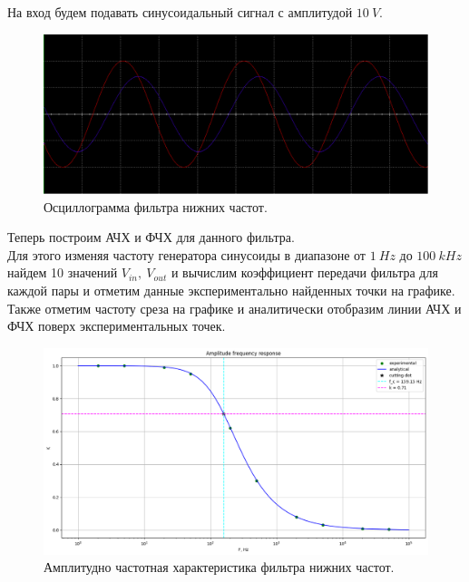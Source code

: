 \documentclass[12pt]{article}
\begin{document}
На вход будем подавать синусоидальный сигнал с амплитудой $10 \ V$. \\

\begin{figure}[H]
    \centering
    \includegraphics[width=\textwidth]{1_osc.png}
    \caption{Осциллограмма фильтра нижних частот.}
    \label{fig:1_osc}
\end{figure}

Теперь построим АЧХ и ФЧХ для данного фильтра. \\
Для этого изменяя частоту генератора синусоиды в диапазоне от $1 \ Hz$ до $100 \ kHz$ найдем 10 значений $V_{in}, \ V_{out}$ и вычислим коэффициент передачи фильтра для каждой пары и отметим данные экспериментально найденных точки на графике. \\
Также отметим частоту среза на графике и аналитически отобразим линии АЧХ и ФЧХ поверх экспериментальных точек.

\begin{figure}[H]
    \centering
    \includegraphics[width=\textwidth]{1_afr.png}
    \caption{Амплитудно частотная характеристика фильтра нижних частот.}
    \label{fig:1_afr}
\end{figure}
\end{document}
